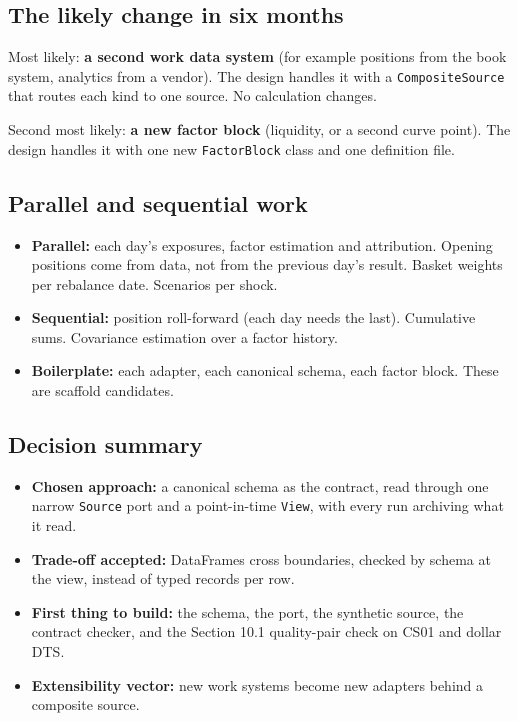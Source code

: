 \documentclass[11pt,a4paper]{article}
\newcommand{\code}[1]{\texttt{\small #1}}
\begin{document}
\subsection{The likely change in six months}
Most likely: \textbf{a second work data system} (for example positions from the book system, analytics from a vendor). The design handles it with a \code{CompositeSource} that routes each kind to one source. No calculation changes.

Second most likely: \textbf{a new factor block} (liquidity, or a second curve point). The design handles it with one new \code{FactorBlock} class and one definition file.

\subsection{Parallel and sequential work}
\begin{itemize}
\item \textbf{Parallel:} each day's exposures, factor estimation and attribution. Opening positions come from data, not from the previous day's result. Basket weights per rebalance date. Scenarios per shock.
\item \textbf{Sequential:} position roll-forward (each day needs the last). Cumulative sums. Covariance estimation over a factor history.
\item \textbf{Boilerplate:} each adapter, each canonical schema, each factor block. These are scaffold candidates.
\end{itemize}

\subsection*{Decision summary}
\begin{itemize}
\item \textbf{Chosen approach:} a canonical schema as the contract, read through one narrow \code{Source} port and a point-in-time \code{View}, with every run archiving what it read.
\item \textbf{Trade-off accepted:} DataFrames cross boundaries, checked by schema at the view, instead of typed records per row.
\item \textbf{First thing to build:} the schema, the port, the synthetic source, the contract checker, and the Section 10.1 quality-pair check on CS01 and dollar DTS.
\item \textbf{Extensibility vector:} new work systems become new adapters behind a composite source.
\end{itemize}
\end{document}
